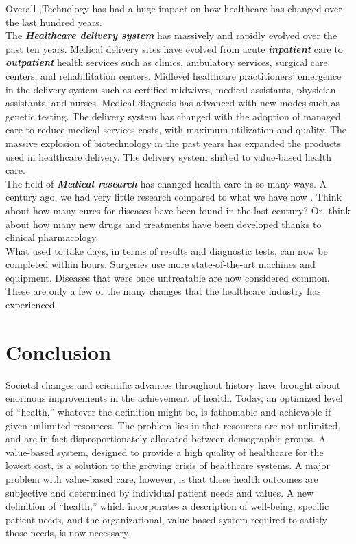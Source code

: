 \documentclass[12pt]{article}
\begin{document}
Overall ,Technology has had a huge impact on how healthcare has changed over the last hundred years. \newline \\
The \textbf{\emph{Healthcare delivery system}} has massively and rapidly evolved over the past ten years. Medical delivery sites have evolved from acute \textbf{\emph{inpatient}} care to \textbf{\emph{outpatient}} health services such as clinics, ambulatory services, surgical care centers, and rehabilitation centers. Midlevel healthcare practitioners' emergence in the delivery system such as certified midwives, medical assistants, physician assistants, and nurses. Medical diagnosis has advanced with new modes such as genetic testing. The delivery system has changed with the adoption of managed care to reduce medical services costs, with maximum utilization and quality. The massive explosion of biotechnology in the past years has expanded the products used in healthcare delivery. The delivery system shifted to value-based health care.\newline \\
The field of \textbf{\emph{Medical research}} has changed health care in so many ways. A century ago, we had very little research compared to what we have now . Think about how many cures for diseases have been found in the last century? Or, think about how many new drugs and treatments have been developed thanks to clinical pharmacology.  \newline \\
What used to take days, in terms of results and diagnostic tests, can now be completed within hours. Surgeries use more state-of-the-art machines and equipment. Diseases that were once untreatable are now considered common. These are only a few of the many changes that the healthcare industry has experienced.

\section{Conclusion}
Societal changes and scientific advances throughout history have brought about enormous improvements in the achievement of health. Today, an optimized level of “health,” whatever the definition might be, is fathomable and achievable if given unlimited resources. The problem lies in that resources are not unlimited, and are in fact disproportionately allocated between demographic groups. A value-based system, designed to provide a high quality of healthcare for the lowest cost, is a solution to the growing crisis of healthcare systems. A major problem with value-based care, however, is that these health outcomes are subjective and determined by individual patient needs and values. A new definition of “health,” which incorporates a description of well-being, specific patient needs, and the organizational, value-based system required to satisfy those needs, is now necessary.
\end{document}
